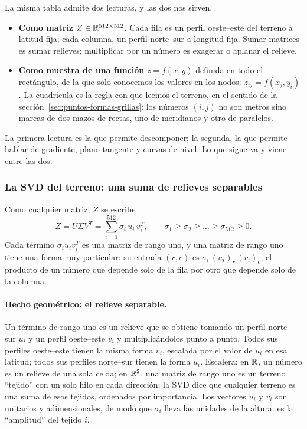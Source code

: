 La misma tabla admite dos lecturas, y las dos nos sirven.

\begin{itemize}
  \item \textbf{Como matriz} \(Z\in\mathbb{R}^{512\times512}\). Cada fila es un perfil
  oeste--este del terreno a latitud fija; cada columna, un perfil norte--sur a longitud fija.
  Sumar matrices es sumar relieves; multiplicar por un número es exagerar o aplanar el
  relieve.
  \item \textbf{Como muestra de una función} \(z=f(x,y)\) definida en todo el rectángulo,
  de la que solo conocemos los valores en los nodos: \(z_{ij}=f(x_j,y_i)\). La cuadrícula es
  la regla con que leemos el terreno, en el sentido de la
  sección~\ref{sec:puntos-formas-grillas}: los números \((i,j)\) no son metros sino marcas
  de dos mazos de rectas, uno de meridianos y otro de paralelos.
\end{itemize}

La primera lectura es la que permite descomponer; la segunda, la que permite hablar de
gradiente, plano tangente y curvas de nivel. Lo que sigue va y viene entre las dos.

\subsubsection{La SVD del terreno: una suma de relieves separables}\label{sec:svd-dem-separables}

Como cualquier matriz, \(Z\) se escribe
\[
  Z=U\Sigma V^T=\sum_{i=1}^{512}\sigma_i\,u_i\,v_i^T ,
  \qquad \sigma_1\ge\sigma_2\ge\dots\ge\sigma_{512}\ge0 .
\]
Cada término \(\sigma_iu_iv_i^T\) es una matriz de rango uno, y una matriz de rango uno
tiene una forma muy particular: su entrada \((r,c)\) es \(\sigma_i\,(u_i)_r\,(v_i)_c\), el
producto de un número que depende solo de la fila por otro que depende solo de la columna.

\paragraph{Hecho geométrico: el relieve separable.} Un término de rango uno es un relieve
que se obtiene tomando un perfil norte--sur \(u_i\) y un perfil oeste--este \(v_i\) y
multiplicándolos punto a punto. Todos sus perfiles oeste--este tienen la misma forma
\(v_i\), escalada por el valor de \(u_i\) en esa latitud; todos sus perfiles norte--sur tienen
la forma \(u_i\). Escalera: en \(\mathbb{R}\), un número es un relieve de una sola celda; en
\(\mathbb{R}^2\), una matriz de rango uno es un terreno \enquote{tejido} con un solo hilo en cada
dirección; la SVD dice que cualquier terreno es una suma de esos tejidos, ordenados por
importancia. Los vectores \(u_i\) y \(v_i\) son unitarios y adimensionales, de modo que
\(\sigma_i\) lleva las unidades de la altura: es la \enquote{amplitud} del tejido \(i\).

